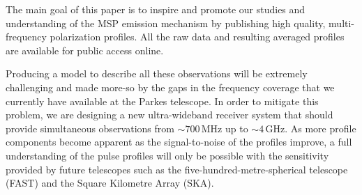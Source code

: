 \documentclass[useAMS,usenatbib]{mn2e}
\begin{document}
%
The main goal of this paper is to inspire and promote our studies and understanding 
of the MSP emission mechanism by publishing high quality, multi-frequency 
polarization profiles.
%
All the raw data and resulting averaged profiles are available for 
public access online.
%

Producing a model to describe all these observations will be extremely 
challenging and made more-so by the gaps in the frequency coverage that we 
currently have available at the Parkes telescope.  
%
In order to mitigate this problem, we are designing a new ultra-wideband 
receiver system that should provide simultaneous observations from $\sim700$\,MHz 
up to $\sim4$\,GHz.  
%
As more profile components become apparent as the signal-to-noise of the profiles 
improve, a full understanding of the pulse profiles will only be possible with 
the sensitivity provided by future telescopes such as the five-hundred-metre-spherical 
telescope (FAST) and the Square Kilometre Array (SKA).


%
\end{document}
